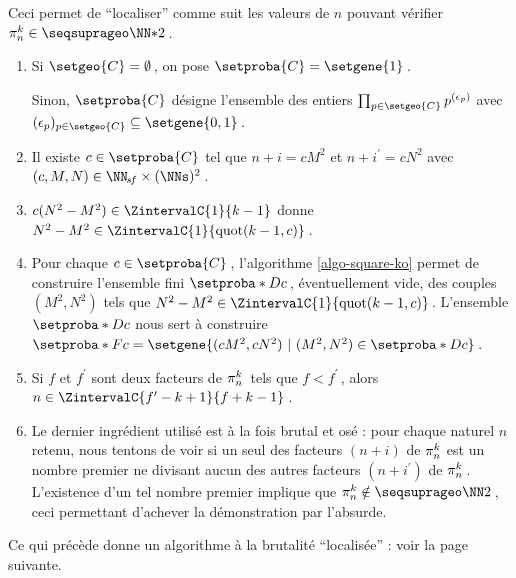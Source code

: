 Ceci permet de \enquote{localiser} comme suit les valeurs de $n$ pouvant vérifier $\consprod \in \NNssquare$\,.
%
\begin{enumerate}
	\item Si $\setgeo{C} = \emptyset$\,, on pose $\setproba{C} = \setgene{1}$\,. 
	
	\noindent
	Sinon, $\setproba{C}$ désigne l'ensemble des entiers $\prod_{p \in \setgeo{C}} p^{(\epsilon_p)}$ avec $(\epsilon_p)_{p \in \setgeo{C}} \subseteq \setgene{0, 1}$\,.


	\item Il existe $c \in \setproba{C}$ tel que $n+i = c M^2$ et $n+i^\prime = c N^2$ avec $(c, M, N) \in \NNsf \times ( \NNs )^2$\,.
	


	\item $c ( N^2 - M^2 ) \in \ZintervalC{1}{k-1}$ donne $N^2 - M^2 \in \ZintervalC{1}{\quot{k-1}{c}}$\,.


	\item Pour chaque $c \in \setproba{C}$\,, l'algorithme \ref{algo-square-ko} permet de construire l'ensemble fini $\setproba*{D}{c}$\,, éventuellement vide, des couples $(M^2, N^2)$ tels que $N^2 - M^2 \in \ZintervalC{1}{\quot{k-1}{c}}$\,.
	L'ensemble $\setproba*{D}{c}$ nous sert à construire
	$\setproba*{F}{c} = \setgene{ (c M^2, c N^2) \,\, | \,\, (M^2, N^2) \in \setproba*{D}{c} }$\,.
	


	\item Si $f$ et $f^\prime$ sont deux facteurs de $\consprod$\, tels que $f < f^\prime$\,, alors $n \in \ZintervalC{f^\prime - k + 1}{f + k - 1}$\,.
	


	\item Le dernier ingrédient utilisé est à la fois brutal et osé : pour chaque naturel $n$ retenu, nous tentons de voir si un seul des facteurs $(n+i)$ de $\consprod$ est un nombre premier ne divisant aucun des autres facteurs $(n+i^\prime)$ de $\consprod$\,.
	L'existence d'un tel nombre premier implique que $\consprod \notin \NNsquare$\,, ceci permettant d'achever la démonstration par l'absurde.
	
\end{enumerate}



Ce qui précède donne un algorithme à la brutalité \enquote{localisée} : voir la page suivante.

